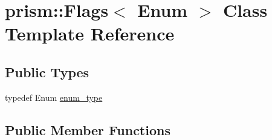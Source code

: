 \hypertarget{classprism_1_1_flags}{}\section{prism\+:\+:Flags$<$ Enum $>$ Class Template Reference}
\label{classprism_1_1_flags}
\subsection*{Public Types}
\begin{DoxyCompactItemize}
\item 
typedef Enum \hyperlink{classprism_1_1_flags_a2415ba62bc10f8590955edcb9c738e5b}{enum\+\_\+type}
\end{DoxyCompactItemize}
\subsection*{Public Member Functions}
